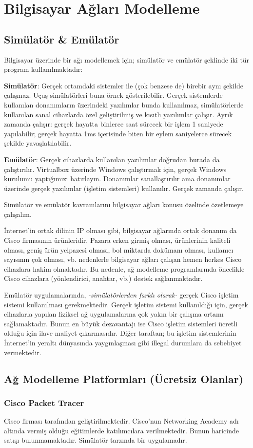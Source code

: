 \section{Bilgisayar Ağları Modelleme}
\subsection{Simülatör \& Emülatör}
Bilgisayar üzerinde bir ağı modellemek için; simülatör ve emülatör şeklinde iki tür program kullanılmaktadır:

\textbf{Simülatör}: Gerçek ortamdaki sistemler ile (çok benzese de) birebir aynı şekilde çalışmaz. Uçuş simülatörleri buna örnek gösterilebilir. Gerçek sistemlerde kullanılan donanımların üzerindeki yazılımlar bunda kullanılmaz, simülatörlerde kullanılan sanal cihazlarda özel geliştirilmiş ve kısıtlı yazılımlar çalışır. Ayrık zamanda çalışır: gerçek hayatta binlerce saat sürecek bir işlem 1 saniyede yapılabilir;  gerçek hayatta 1ms içerisinde biten bir eylem saniyelerce sürecek şekilde yavaşlatılabilir.

\vskip 0.5cm
\textbf{Emülatör}: Gerçek cihazlarda kullanılan yazılımlar doğrudan burada da çalıştırılır. Virtualbox üzerinde Windows çalıştırmak için, gerçek Windows kurulumu yaptığımızı hatırlayın. Donanımlar sanallaştırılır ama donanımlar üzerinde gerçek yazılımlar (işletim sistemleri) kullanılır. Gerçek zamanda çalışır.

\vskip 0.5cm
Simülatör ve emülatör kavramlarını bilgisayar ağları konusu özelinde özetlemeye çalışalım.
\vskip 0.5cm

İnternet'in ortak dilinin IP olması gibi, bilgisayar ağlarında ortak donanım da Cisco firmasının ürünleridir. Pazara erken girmiş olması, ürünlerinin kaliteli olması, geniş ürün yelpazesi olması, bol miktarda dokümanı olması, kullanıcı sayısının çok olması, vb. nedenlerle bilgisayar ağları çalışan hemen herkes Cisco cihazlara hakim olmaktadır. Bu nedenle, ağ modelleme programlarında öncelikle Cisco cihazlara (yönlendirici, anahtar, vb.) destek sağlanmaktadır.

Emülatör uygulamalarında, \textit{-simülatörlerden farklı olarak-} gerçek Cisco işletim sistemi kullanılması gerekmektedir. Gerçek işletim sistemi kullanıldığı için, gerçek cihazlarla yapılan fiziksel ağ uygulamalarına çok yakın bir çalışma ortamı sağlamaktadır. Bunun en büyük dezavantajı ise Cisco işletim sistemleri ücretli olduğu için ilave maliyet çıkarmasıdır. Diğer taraftan; bu işletim sistemlerinin İnternet'in yeraltı dünyasında yaygınlaşması gibi illegal durumlara da sebebiyet vermektedir.

\subsection{Ağ Modelleme Platformları (Ücretsiz Olanlar)}
\subsubsection*{Cisco Packet Tracer}
Cisco firması tarafından geliştirilmektedir. Cisco'nun Networking Academy adı altında vermiş olduğu eğitimlerde katılımcılara verilmektedir. Bunun haricinde satışı bulunmamaktadır. Simülatör tarzında bir uygulamadır.

